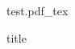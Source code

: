 \documentclass[10pt,twoside]{article}
\newcommand{\incfig}[1]{%
    \def\svgwidth{\columnwidth}
    {#1.pdf_tex}
}
\begin{document}
\begin{figure}[ht]
    \centering
    \incfig{test}
    \caption{title}
    \label{fig:test}
\end{figure}
\end{document}

